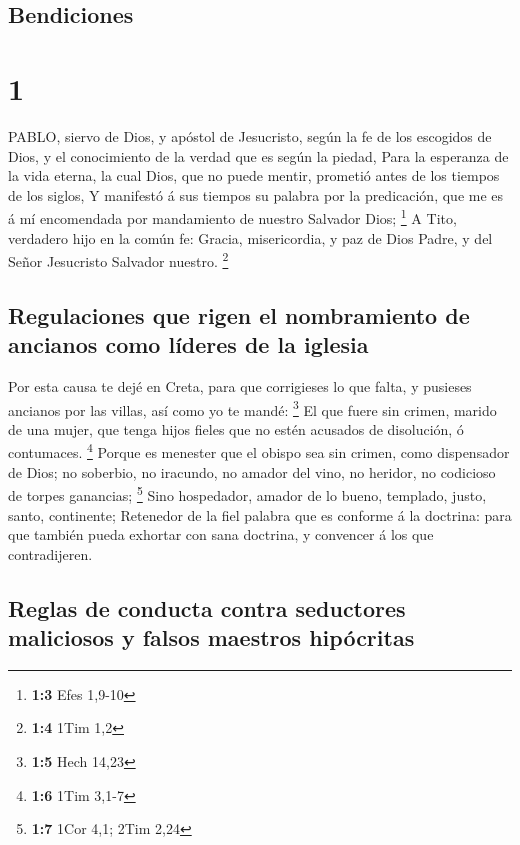 \hypertarget{bendiciones}{%
\subsection{Bendiciones}\label{bendiciones}}

\hypertarget{section}{%
\section{1}\label{section}}

 PABLO, siervo de Dios, y apóstol de Jesucristo, según la fe
de los escogidos de Dios, y el conocimiento de la verdad que es según la
piedad,  Para la esperanza de la vida eterna, la cual Dios,
que no puede mentir, prometió antes de los tiempos de los siglos,
 Y manifestó á sus tiempos su palabra por la predicación,
que me es á mí encomendada por mandamiento de nuestro Salvador Dios;
\footnote{\textbf{1:3} Efes 1,9-10}  A Tito, verdadero hijo
en la común fe: Gracia, misericordia, y paz de Dios Padre, y del Señor
Jesucristo Salvador nuestro. \footnote{\textbf{1:4} 1Tim 1,2}

\hypertarget{regulaciones-que-rigen-el-nombramiento-de-ancianos-como-luxedderes-de-la-iglesia}{%
\subsection{Regulaciones que rigen el nombramiento de ancianos como
líderes de la
iglesia}\label{regulaciones-que-rigen-el-nombramiento-de-ancianos-como-luxedderes-de-la-iglesia}}

 Por esta causa te dejé en Creta, para que corrigieses lo
que falta, y pusieses ancianos por las villas, así como yo te mandé:
\footnote{\textbf{1:5} Hech 14,23}  El que fuere sin crimen,
marido de una mujer, que tenga hijos fieles que no estén acusados de
disolución, ó contumaces. \footnote{\textbf{1:6} 1Tim 3,1-7}
 Porque es menester que el obispo sea sin crimen, como
dispensador de Dios; no soberbio, no iracundo, no amador del vino, no
heridor, no codicioso de torpes ganancias; \footnote{\textbf{1:7} 1Cor
  4,1; 2Tim 2,24}  Sino hospedador, amador de lo bueno,
templado, justo, santo, continente;  Retenedor de la fiel
palabra que es conforme á la doctrina: para que también pueda exhortar
con sana doctrina, y convencer á los que contradijeren.

\hypertarget{reglas-de-conducta-contra-seductores-maliciosos-y-falsos-maestros-hipuxf3critas}{%
\subsection{Reglas de conducta contra seductores maliciosos y falsos
maestros
hipócritas}\label{reglas-de-conducta-contra-seductores-maliciosos-y-falsos-maestros-hipuxf3critas}}

